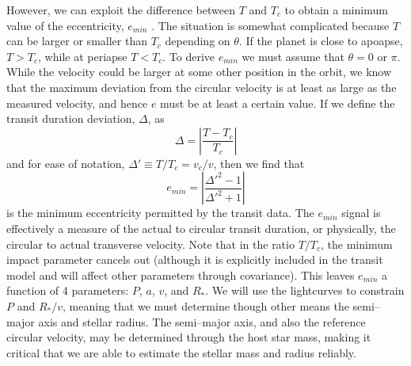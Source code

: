 However, we can exploit the difference between $T$ and $T_c$ to obtain
a minimum value of the eccentricity, $e_{min}$ \citep{Barnes07}. The
situation is somewhat complicated because $T$ can be larger or smaller
than $T_c$ depending on $\theta$. If the planet is close to apoapse,
$T > T_c$, while at periapse $T < T_c$. To derive $e_{min}$ we must
assume that $\theta = 0$ or $\pi$. While the velocity could be larger
at some other position in the orbit, we know that the maximum
deviation from the circular velocity is at least as large as the
measured velocity, and hence $e$ must be at least a certain value. If
we define the transit duration deviation, $\Delta$, as
\begin{equation}\label{eq:tdd}
\Delta = \left|\frac{T-T_c}{T_c}\right|
\end{equation}
and for ease of notation, $\Delta' \equiv T/T_c = v_c/v$,
then we find that
\begin{equation}\label{eq:emin}
e_{min} = \left|\frac{\Delta'^2 - 1}{\Delta'^2 + 1}\right|
\end{equation}
is the minimum eccentricity permitted by the transit data.  The
$e_{min}$ signal is effectively a measure of the actual to circular
transit duration, or physically, the circular to actual transverse
velocity.  Note that in the ratio $T/T_c$, the minimum impact
parameter cancels out (although it is explicitly included in the
transit model and will affect other parameters through covariance).
This leaves $e_{min}$ a function of 4 parameters: $P$, $a$, $v$, and
$R_*$.  We will use the \kepler lightcurves to constrain $P$ and
$R_*/v$, meaning that we must determine though other means the
semi--major axis and stellar radius.  The semi--major axis, and also
the reference circular velocity, may be determined through the host
star mass, making it critical that we are able to estimate the stellar
mass and radius reliably.

